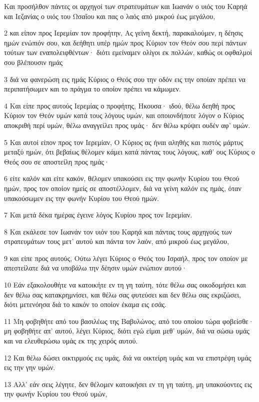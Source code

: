 \par Και προσήλθον πάντες οι αρχηγοί των στρατευμάτων και Ιωανάν ο υιός του Καρηά και Ιεζανίας ο υιός του Ωσαΐου και πας ο λαός από μικρού έως μεγάλου,
\par 2 και είπον προς Ιερεμίαν τον προφήτην, Ας γείνη δεκτή, παρακαλούμεν, η δέησις ημών ενώπιόν σου, και δεήθητι υπέρ ημών προς Κύριον τον Θεόν σου περί πάντων τούτων των εναπολειφθέντων· διότι εμείναμεν ολίγοι εκ πολλών, καθώς οι οφθαλμοί σου βλέπουσιν ημάς
\par 3 διά να φανερώση εις ημάς Κύριος ο Θεός σου την οδόν εις την οποίαν πρέπει να περιπατήσωμεν και το πράγμα το οποίον πρέπει να κάμωμεν.
\par 4 Και είπε προς αυτούς Ιερεμίας ο προφήτης, Ηκουσα· ιδού, θέλω δεηθή προς Κύριον τον Θεόν υμών κατά τους λόγους υμών, και οποιονδήποτε λόγον ο Κύριος αποκριθή περί υμών, θέλω αναγγείλει προς υμάς· δεν θέλω κρύψει ουδέν αφ' υμών.
\par 5 Και αυτοί είπον προς τον Ιερεμίαν, Ο Κύριος ας ήναι αληθής και πιστός μάρτυς μεταξύ ημών, ότι βεβαίως θέλομεν κάμει κατά πάντας τους λόγους, καθ' ους Κύριος ο Θεός σου σε αποστείλη προς ημάς·
\par 6 είτε καλόν και είτε κακόν, θέλομεν υπακούσει εις την φωνήν Κυρίου του Θεού ημών, προς τον οποίον ημείς σε αποστέλλομεν, διά να γείνη καλόν εις ημάς, όταν υπακούσωμεν εις την φωνήν Κυρίου του Θεού ημών.
\par 7 Και μετά δέκα ημέρας έγεινε λόγος Κυρίου προς τον Ιερεμίαν.
\par 8 Και εκάλεσε τον Ιωανάν τον υιόν του Καρηά και πάντας τους αρχηγούς των στρατευμάτων τους μετ' αυτού και πάντα τον λαόν, από μικρού έως μεγάλου,
\par 9 και είπε προς αυτούς, Ούτω λέγει Κύριος ο Θεός του Ισραήλ, προς τον οποίον με απεστείλατε διά να υποβάλω την δέησιν υμών ενώπιον αυτού·
\par 10 Εάν εξακολουθήτε να κατοικήτε εν τη γη ταύτη, τότε θέλω σας οικοδομήσει και δεν θέλω σας κατακρημνίσει, και θέλω σας φυτεύσει και δεν θέλω σας εκριζώσει, διότι μετενόησα διά το κακόν το οποίον έκαμα εις εσάς.
\par 11 Μη φοβηθήτε από του βασιλέως της Βαβυλώνος, από του οποίου τώρα φοβείσθε· μη φοβηθήτε απ' αυτού, λέγει Κύριος, διότι εγώ είμαι μεθ' υμών, διά να σώσω υμάς και να ελευθερώσω υμάς εκ της χειρός αυτού.
\par 12 Και θέλω δώσει οικτιρμούς εις υμάς, διά να οικτείρη υμάς και να επιστρέψη υμάς εις την γην υμών.
\par 13 Αλλ' εάν σεις λέγητε, δεν θέλομεν κατοικήσει εν τη γη ταύτη, μη υπακούοντες εις την φωνήν Κυρίου του Θεού υμών,
